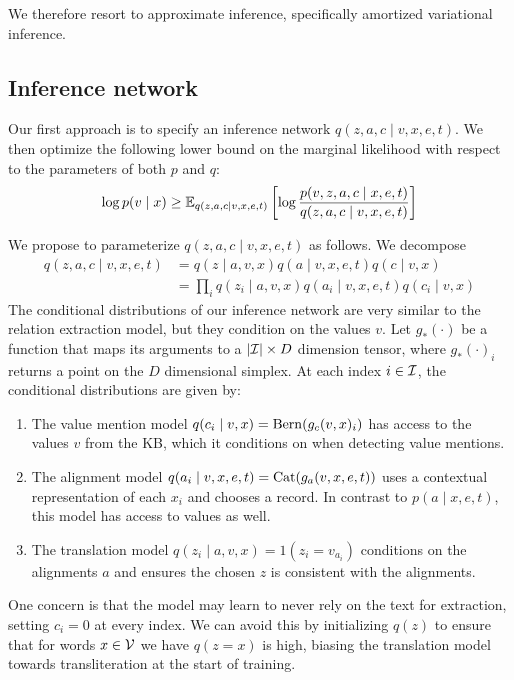 \documentclass[12pt]{article}
\begin{document}
We therefore resort to approximate inference,
specifically amortized variational inference.

\subsection{Inference network}
Our first approach is to specify an inference network $q(z,a,c\mid v,x,e,t)$.
We then optimize the following lower bound on the marginal likelihood
with respect to the parameters of both $p$ and $q$:
\begin{equation}
\label{eqn:lowerbound}
\log p(v\mid x) \geq
\mathbb{E}_{q(z,a,c\mid v,x,e,t)}\left[\log \frac{p(v,z,a,c\mid x,e,t)}{q(z,a,c\mid v,x,e,t)}\right]
\end{equation}

We propose to parameterize $q(z,a,c\mid v,x,e,t)$ as follows.
We decompose 
\begin{equation}
\begin{aligned}
q(z,a,c\mid v,x,e,t) &= q(z \mid a,v,x)q(a\mid v,x,e,t)q(c \mid v,x)\\
&= \prod_i q(z_i \mid a,v,x)q(a_i \mid v,x,e,t)q(c_i \mid v,x)
\end{aligned}
\end{equation}
The conditional distributions of our inference network
are very similar to the relation extraction model,
but they condition on the values $v$.
Let $g_*(\cdot)$ be a function that maps its arguments to a $|\mathcal{I}| \times D$
dimension tensor, where $g_*(\cdot)_i$ returns a point on the $D$ dimensional simplex.
At each index $i \in \mathcal{I}$, the conditional distributions are given by:
\begin{enumerate}
\item The value mention model $q(c_i \mid v,x) = \mathrm{Bern}(g_{c}(v,x)_i)$ 
    has access to the values $v$ from the KB, which it conditions on
    when detecting value mentions. 
\item The alignment model $q(a_i \mid v,x,e,t) = \mathrm{Cat}(g_{a}(v,x,e,t))$
    uses a contextual representation of each $x_i$ and chooses a record.
    In contrast to $p(a\mid x,e,t)$, this model has access to values as well.
\item The translation model $q(z_i \mid a,v,x) = 1(z_i = v_{a_i})$
    conditions on the alignments $a$ and ensures the chosen $z$ is consistent
    with the alignments. 
\end{enumerate}

One concern is that the model may learn to never rely on the text for extraction,
setting $c_i = 0$ at every index.
We can avoid this by initializing $q(z)$ to ensure that for words $x \in \mathcal{V}$ 
we have $q(z = x)$ is high, biasing the translation model towards transliteration
at the start of training.
\end{document}
